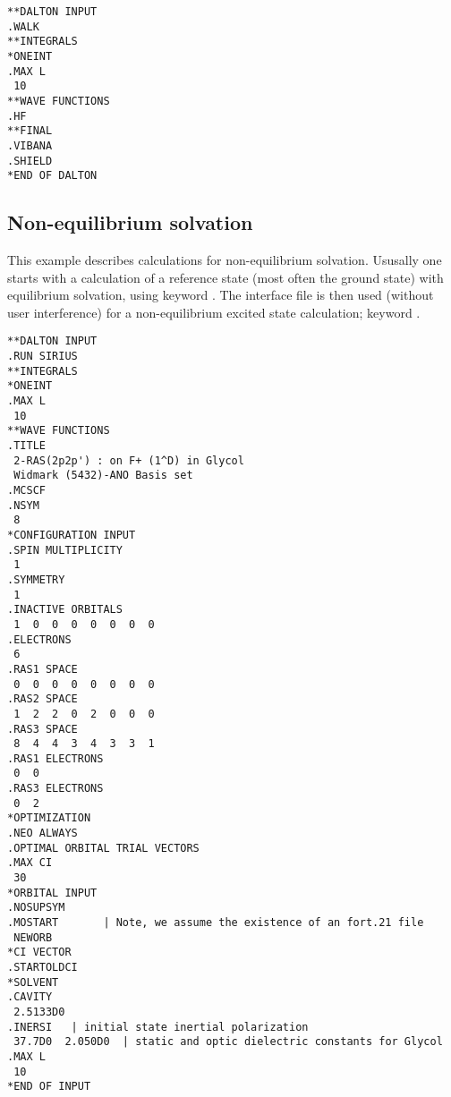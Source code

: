\begin{verbatim}
**DALTON INPUT
.WALK
**INTEGRALS
*ONEINT
.MAX L
 10
**WAVE FUNCTIONS
.HF
**FINAL
.VIBANA
.SHIELD
*END OF DALTON
\end{verbatim}


\subsection{Non-equilibrium solvation}

This example describes calculations for non-equilibrium
solvation. 
Ususally one starts with a calculation of a reference state
(most often the ground state) with equilibrium solvation, using
keyword . The interface file is then
used (without user interference) for
a non-equilibrium excited state calculation; keyword
. 

\begin{verbatim}
**DALTON INPUT
.RUN SIRIUS
**INTEGRALS
*ONEINT
.MAX L
 10
**WAVE FUNCTIONS
.TITLE
 2-RAS(2p2p') : on F+ (1^D) in Glycol 
 Widmark (5432)-ANO Basis set 
.MCSCF        
.NSYM
 8
*CONFIGURATION INPUT
.SPIN MULTIPLICITY
 1
.SYMMETRY
 1
.INACTIVE ORBITALS
 1  0  0  0  0  0  0  0 
.ELECTRONS
 6
.RAS1 SPACE
 0  0  0  0  0  0  0  0
.RAS2 SPACE
 1  2  2  0  2  0  0  0
.RAS3 SPACE
 8  4  4  3  4  3  3  1
.RAS1 ELECTRONS 
 0  0 
.RAS3 ELECTRONS 
 0  2 
*OPTIMIZATION
.NEO ALWAYS
.OPTIMAL ORBITAL TRIAL VECTORS
.MAX CI
 30
*ORBITAL INPUT
.NOSUPSYM
.MOSTART       | Note, we assume the existence of an fort.21 file
 NEWORB
*CI VECTOR
.STARTOLDCI
*SOLVENT
.CAVITY
 2.5133D0
.INERSI   | initial state inertial polarization
 37.7D0  2.050D0  | static and optic dielectric constants for Glycol
.MAX L
 10
*END OF INPUT
\end{verbatim}
